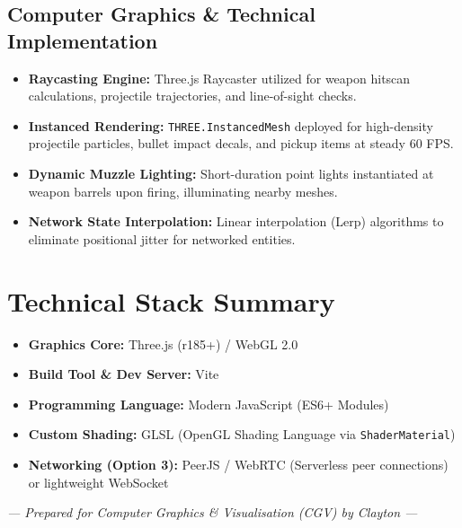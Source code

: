 \documentclass[11pt,a4paper]{article}
\begin{document}
\subsection{Computer Graphics \& Technical Implementation}
\begin{itemize}
    \item \textbf{Raycasting Engine:} Three.js Raycaster utilized for weapon hitscan calculations, projectile trajectories, and line-of-sight checks.
    \item \textbf{Instanced Rendering:} \texttt{THREE.InstancedMesh} deployed for high-density projectile particles, bullet impact decals, and pickup items at steady 60 FPS.
    \item \textbf{Dynamic Muzzle Lighting:} Short-duration point lights instantiated at weapon barrels upon firing, illuminating nearby meshes.
    \item \textbf{Network State Interpolation:} Linear interpolation (Lerp) algorithms to eliminate positional jitter for networked entities.
\end{itemize}

\section{Technical Stack Summary}

\begin{itemize}
    \item \textbf{Graphics Core:} Three.js (r185+) / WebGL 2.0
    \item \textbf{Build Tool \& Dev Server:} Vite
    \item \textbf{Programming Language:} Modern JavaScript (ES6+ Modules)
    \item \textbf{Custom Shading:} GLSL (OpenGL Shading Language via \texttt{ShaderMaterial})
    \item \textbf{Networking (Option 3):} PeerJS / WebRTC (Serverless peer connections) or lightweight WebSocket
\end{itemize}

\vspace{1.5em}
\begin{center}
\small\itshape --- Prepared for Computer Graphics \& Visualisation (CGV) by Clayton ---
\end{center}
\end{document}
